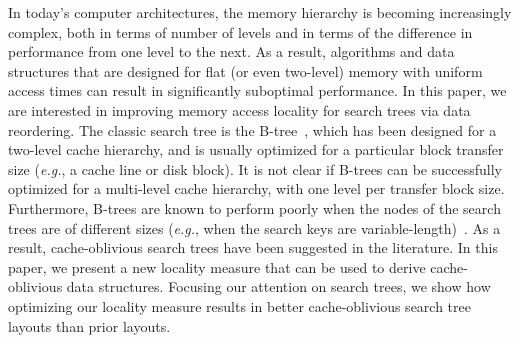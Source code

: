 \documentclass[10pt,conference,letterpaper]{IEEEtran}
\newcommand{\note}[1]{}
\newcommand{\nodes}{nodes\xspace}
\newcommand{\eg}{{\it e.g.}\xspace}
\begin{document}
\note{Need to reference Safro's MLogA papers. Done.}

In today's computer architectures, the memory hierarchy is becoming increasingly complex, both in terms of number of levels and in terms of the difference in performance from one level to the next.
As a result, algorithms and data structures that are designed for flat (or even two-level) memory with uniform access times can result in significantly suboptimal performance.
In this paper, we are interested in improving memory access locality for search trees via data reordering.
The classic search tree is the B-tree~\cite{Bayer:Btrees}, which has been designed for a two-level cache hierarchy, and is usually optimized for a particular block transfer size (\eg, a cache line or disk block). It is not clear if B-trees can be successfully optimized for a multi-level cache hierarchy, with one level per transfer block size. Furthermore, B-trees are known to perform poorly when the \nodes of the search trees are of different sizes (\eg, when the search keys are variable-length)~\cite{Bender:COStringBT}. As a result, cache-oblivious search trees have been suggested in the literature. In this paper, we present a new locality measure that can be used to derive cache-oblivious data structures.
Focusing our attention on search trees, we show how optimizing our locality measure results in better cache-oblivious search tree layouts than prior layouts.
\end{document}
